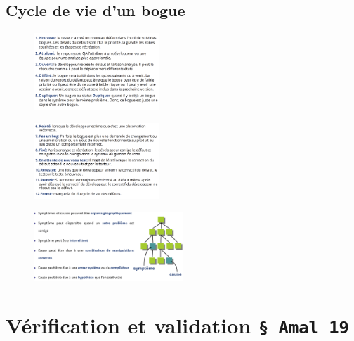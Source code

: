 \documentclass[16pt]{report}
\begin{document}
\begin{multicols*}{2}
        \section{Cycle de vie d'un bogue}


        \begin{figure}[H]
            \begin{center}
                \includegraphics[width=0.42\textwidth]{cyclevie1.png}
            \end{center}
        \end{figure}
        

        \begin{figure}[H]
            \begin{center}
                \includegraphics[width=0.42\textwidth]{cyclevie2.png}
            \end{center}
        \end{figure}


        \begin{figure}[H]
            \begin{center}
                \includegraphics[width=0.50\textwidth]{symptCause.png}
            \end{center}
        \end{figure}


        \chapter{Vérification et validation \texttt{\S \; Amal 19}  }


\end{multicols*}
\end{document}
